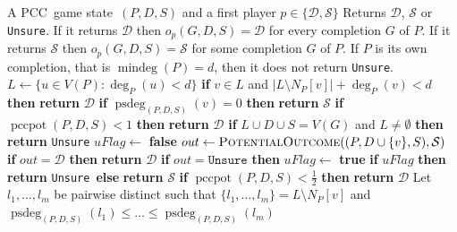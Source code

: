 \documentclass[a4paper,11pt,oneside]{scrartcl}
\theoremstyle{definition}
\theoremstyle{remark}
\DeclareMathOperator{\mindeg}{mindeg}
\DeclareMathOperator{\pccgsdeg}{psdeg}
\DeclareMathOperator{\pccpot}{pccpot}
\newcommand{\pcc}{PCC}
\newcommand{\pccgs}{\pcc\ game state}
\newcommand{\unsure}{\texttt{Unsure}}
\begin{document}
\begin{algorithm}[H]
    \caption{\textsc{PotentialOutcome}$((P,D,S),p)$}
    \label{algorithm:potential_outcome}
    \begin{algorithmic}[1]
        \REQUIRE A \pccgs\ $(P,D,S)$ and a first player $p \in \{\mathcal D, \mathcal S\}$
        \ENSURE Returns $\mathcal D$, $\mathcal S$ or \unsure. If it returns $\mathcal D$ then $o_p(G,D,S) = \mathcal D$ for every completion $G$ of $P$. If it returns $\mathcal S$ then $o_p(G,D,S) = \mathcal S$ for some completion $G$ of $P$. If $P$ is its own completion, that is $\mindeg(P) = d$, then it does not return \unsure. 
        \STATE $L \gets \{u \in V(P) : \deg_{P}(u) < d\}$ 
            \STATE \textbf{if} $v \in L$ and $|L \setminus N_P[v]| + \deg_P(v) < d$ \textbf{then} \textbf{return} $\mathcal D$ \label{algorithm_line:potential_outcome_no_completion}
            \STATE \textbf{if} $\pccgsdeg_{(P,D,S)}(v) = 0$ \textbf{then} \textbf{return} $\mathcal S$ \label{algorithm_line:potential_outcome_Staller_already_won}
        \ENDFOR
            \STATE \textbf{if} $\pccpot(P,D,S) < 1$ \textbf{then} \textbf{return} $\mathcal D$ \label{algorithm_line:potential_outcome_Dominator_potreturn}
            \STATE \textbf{if} $L \cup D \cup S = V(G)$ and $L \neq \emptyset$ \textbf{then} \textbf{return} \unsure \label{algorithm_line:potential_outcome_Dominator_has_no_move_unsure}
            \STATE $uFlag \gets$ \textbf{false}
                \STATE $out \gets \textsc{PotentialOutcome}((P, D \cup \{v\}, S), \mathcal S)$
                \STATE \textbf{if} $out = \mathcal D$ \textbf{then} \textbf{return} $\mathcal D$
                \STATE \textbf{if} $out = \unsure$ \textbf{then} $uFlag \gets$ \textbf{true}
            \ENDFOR
            \STATE \textbf{if} $uFlag$ \textbf{then} \textbf{return} \unsure\ \textbf{else} \textbf{return} $\mathcal S$ \label{algorithm_line:potential_outcome_Dominator_final_return}
            \STATE \textbf{if} $\pccpot(P,D,S) < \frac{1}{2}$ \textbf{then} \textbf{return} $\mathcal D$ \label{algorithm_line:potential_outcome_Staller_potreturn}
             \label{algorithm_line:potential_outcome_Staller_L_loop}
                \STATE Let $l_1,\dots,l_m$ be pairwise distinct such that $\{l_1,\dots,l_m\} = L \setminus N_P[v]$ and \label{algorithm_line:potential_outcome_Staller_L_loop_l_def}
                \Statex \quad\quad $\pccgsdeg_{(P,D,S)}(l_1) \leq \dots \leq \pccgsdeg_{(P,D,S)}(l_m)$

\end{algorithmic}
\end{algorithm}
\end{document}
